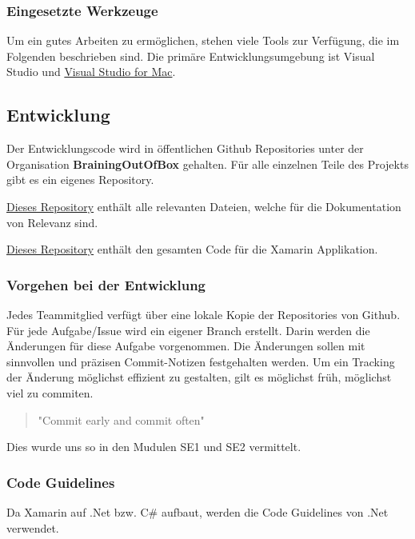 \subsubsection*{Eingesetzte Werkzeuge}
Um ein gutes Arbeiten zu ermöglichen, stehen viele Tools zur Verfügung, die im Folgenden beschrieben sind. Die primäre Entwicklungsumgebung ist Visual Studio und \href{https://visualstudio.microsoft.com/de/vs/mac/}{Visual Studio for Mac}.

\subsection{Entwicklung}
Der Entwicklungscode wird in öffentlichen Github Repositories unter der Organisation \textbf{BrainingOutOfBox }gehalten. Für alle einzelnen Teile des Projekts gibt es ein eigenes Repository.

\begin{description}[leftmargin=!,labelwidth=2cm]
\item [Doc] \href{https://github.com/BrainingOutOfBox/Doc}{Dieses Repository} enthält alle relevanten Dateien, welche für die Dokumentation von Relevanz sind.
\item [App] \href{https://github.com/BrainingOutOfBox/Doc}{Dieses Repository} enthält den gesamten Code für die Xamarin Applikation.
\end{description}

\subsubsection*{Vorgehen bei der Entwicklung}
Jedes Teammitglied verfügt über eine lokale Kopie der Repositories von Github. Für jede Aufgabe/Issue wird ein eigener Branch erstellt. Darin werden die Änderungen für diese Aufgabe vorgenommen. Die Änderungen sollen mit sinnvollen und präzisen Commit-Notizen festgehalten werden. Um ein Tracking der Änderung möglichst effizient zu gestalten, gilt es möglichst früh, möglichst viel zu commiten.

\begin{quote}
	"Commit early and commit often"    
\end{quote}

Dies wurde uns so in den Mudulen SE1 und SE2 vermittelt.

\subsubsection*{Code Guidelines}
Da Xamarin auf .Net bzw. C\# aufbaut, werden die Code Guidelines von .Net verwendet. \cite{guidelines-DotNet}


